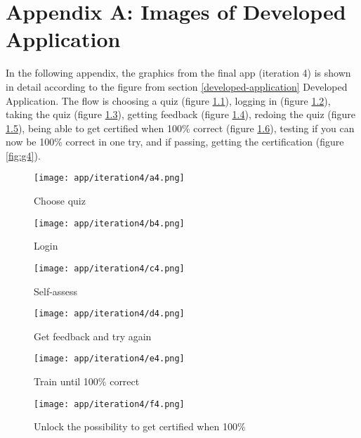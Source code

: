 \chapter{Appendix A: Images of Developed Application}\label{cha:developed-app}

In the following appendix, the graphics from the final app (iteration 4) is shown in detail according to the figure from section \ref{developed-application} Developed Application. The flow is choosing a quiz (figure \ref{fig:a4}), logging in (figure \ref{fig:b4}), taking the quiz (figure \ref{fig:c4}), getting feedback (figure \ref{fig:d4}), redoing the quiz (figure \ref{fig:e4}), being able to get certified when 100\% correct (figure \ref{fig:f4}), testing if you can now be 100\% correct in one try, and if passing, getting the certification (figure \ref{fig:g4}).

\begin{figure}[h]
    \centering
    \texttt{[image: app/iteration4/a4.png]}
    \caption{Choose quiz}
    \label{fig:a4}
\end{figure}

\begin{figure}[h]
    \centering
    \texttt{[image: app/iteration4/b4.png]}
    \caption{Login}
    \label{fig:b4}
\end{figure}

\begin{figure}[h]
    \centering
    \texttt{[image: app/iteration4/c4.png]}
    \caption{Self-assess}
    \label{fig:c4}
\end{figure}

\begin{figure}[h]
    \centering
    \texttt{[image: app/iteration4/d4.png]}
    \caption{Get feedback and try again}
    \label{fig:d4}
\end{figure}

\begin{figure}[h]
    \centering
    \texttt{[image: app/iteration4/e4.png]}
    \caption{Train until 100\% correct}
    \label{fig:e4}
\end{figure}

\begin{figure}[h]
    \centering
    \texttt{[image: app/iteration4/f4.png]}
    \caption{Unlock the possibility to get certified when 100\%}
    \label{fig:f4}
\end{figure}


